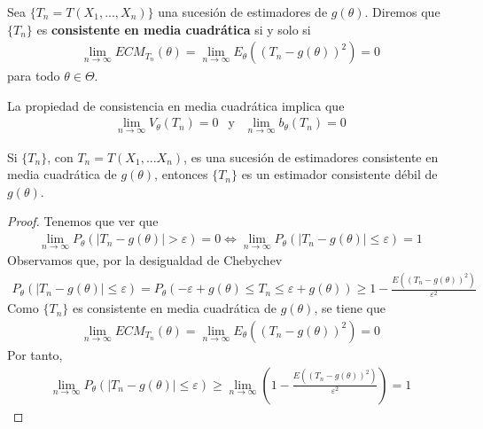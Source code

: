 \begin{defi}
    Sea $\{T_n = T(X_1,...,X_n)\}$ una sucesión de estimadores de $g(\theta)$. Diremos que $\{T_n\}$ es \textbf{consistente en media cuadrática} si y solo si
    \begin{align*}
        \lim_{n \to \infty}{ECM_{T_n}(\theta)} = \lim_{n \to \infty}{E_{\theta}((T_n - g(\theta))^2)} = 0
    \end{align*}
    para todo $\theta \in \Theta$.
\end{defi}

\begin{obs}
    La propiedad de consistencia en media cuadrática implica que
    \begin{align*}
        \lim_{n \to \infty}{V_{\theta}(T_n)} = 0 \ \ \text{ y } \ \ \lim_{n \to \infty}{b_{\theta}(T_n)} = 0
    \end{align*}
\end{obs}

\begin{lema}
    Si $\{T_n\}$, con $T_n = T(X_1,...X_n)$, es una sucesión de estimadores consistente en media cuadrática de $g(\theta)$, entonces $\{T_n\}$ es un estimador consistente débil de $g(\theta)$.
\end{lema}

\begin{proof}
    Tenemos que ver que
    \begin{align*}
        \lim_{n \to \infty}{P_{\theta}(|T_n - g(\theta)| > \varepsilon)} = 0 \Longleftrightarrow  \lim_{n \to \infty}{P_{\theta}(|T_n - g(\theta)| \leq \varepsilon)} = 1
    \end{align*}
    Observamos que, por la desigualdad de Chebychev
    \begin{align*}
        {P_{\theta}(|T_n - g(\theta)| \leq \varepsilon)} = P_{\theta}(-\varepsilon + g(\theta) \leq T_n \leq \varepsilon + g(\theta)) \ge 1 - \frac{E((T_n - g(\theta))^2)}{\varepsilon^2}
    \end{align*}
    Como $\{T_n\}$ es consistente en media cuadrática de $g(\theta)$, se tiene que
    \begin{align*}
        \lim_{n \to \infty}{ECM_{T_n}(\theta)} = \lim_{n \to \infty}{E_{\theta}((T_n - g(\theta))^2)} = 0
    \end{align*}
    Por tanto,
    \begin{align*}
        \lim_{n \to \infty}{P_{\theta}(|T_n - g(\theta)| \leq \varepsilon)} \ge \lim_{n \to \infty}{\left(1 - \frac{E((T_n - g(\theta))^2)}{\varepsilon^2}\right)} = 1
    \end{align*}
\end{proof}


